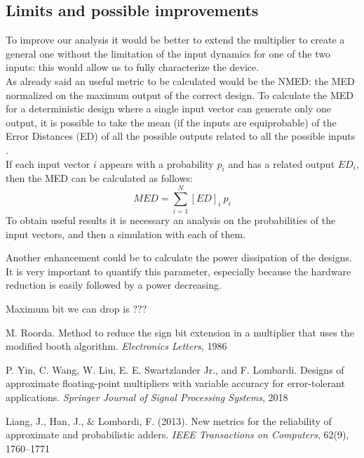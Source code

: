 \documentclass[a4paper]{article}
\begin{document}
	\subsection{Limits and possible improvements}
	To improve our analysis it would be better to extend the multiplier to create a general one without the limitation of the input dynamics for one of the two inputs: this would allow us to fully characterize the device.\\
	As already said an useful metric to be calculated would be the NMED: the MED normalized on the maximum output of the correct design. To calculate the MED for a deterministic design where a single input vector can generate only one output, it is possible to take the mean (if the inputs are equiprobable) of the Error Distances (ED) of all the possible outputs related to all the possible inputs \cite{liang}.\\
	If each input vector $i$ appears with a probability $p_i$ and has a related output $ED_i$, then the MED can be calculated as follows: 
	\begin{equation}
		MED = \displaystyle\sum_{i=1}^{N} [ED]_i\ p_i
	\end{equation}
	To obtain useful results it is necessary an analysis on the probabilities of the input vectors, and then a simulation with each of them.

	Another enhancement could be to calculate the power dissipation of the designs. It is very important to quantify this parameter, especially because the hardware reduction is easily followed by a power decreasing.

	Maximum bit we can drop is ???
	
	

	\begin{thebibliography}{3}
	M. Roorda. Method to reduce the sign bit extension in a multiplier that uses the modified
	booth algorithm. \textit{Electronics Letters}, 1986

	P. Yin, C. Wang, W. Liu, E. E. Swartzlander Jr., and F. Lombardi. Designs of approximate
	floating-point multipliers with variable accuracy for error-tolerant applications. \textit{Springer
	Journal of Signal Processing Systems}, 2018

	Liang, J., Han, J., \& Lombardi, F. (2013). New metrics for the
	reliability of approximate and probabilistic adders. \textit{IEEE 
	Transactions on Computers}, 62(9), 1760–1771
	\end{thebibliography}
\end{document}
